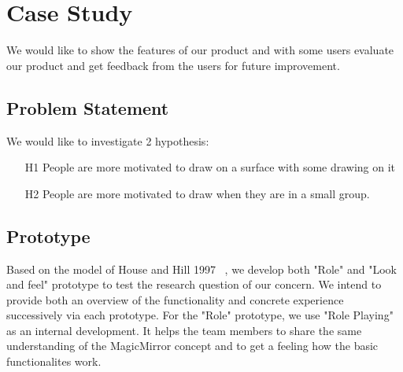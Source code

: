\documentclass{sigchi-ext}
\begin{document}
\section{Case Study}
We would like to show the features of our product and with some users evaluate our product and get feedback from the users for future improvement.
\subsection{Problem Statement}
We would like to investigate 2 hypothesis:
\begin{itemize}
	\item[H1] People are more motivated to draw on a surface with some drawing on it
	\item[H2] People are more motivated to draw when they are in a small group.
\end{itemize}

\subsection{Prototype}
Based on the model of House and Hill 1997 ~\cite{houde_chapter_1997}, we develop both "Role" and "Look and feel" prototype to test the research question of our concern. We intend to provide both an overview of the functionality and concrete experience successively via each prototype.
For the "Role" prototype, we use "Role Playing" as an internal development. It helps the team members to share the same understanding of the MagicMirror concept and to get a feeling how the basic functionalites work.
\end{document}
